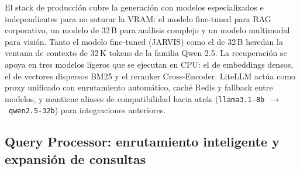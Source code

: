 \begin{table}[H]
\centering
\caption{Stack de modelos en producción (versión TFG y sistema empresarial).}
\label{tab:stack-llm-produccion}
\end{table}

El stack de producción cubre la generación con modelos especializados e independientes para no saturar la VRAM: el modelo fine-tuned para RAG corporativo, un modelo de 32\,B para análisis complejo y un modelo multimodal para visión. Tanto el modelo fine-tuned (JARVIS) como el de 32\,B heredan la ventana de contexto de 32\,K tokens de la familia Qwen 2.5. La recuperación se apoya en tres modelos ligeros que se ejecutan en CPU: el de embeddings densos, el de vectores dispersos BM25 y el reranker Cross-Encoder. LiteLLM actúa como proxy unificado con enrutamiento automático, caché Redis y fallback entre modelos, y mantiene aliases de compatibilidad hacia atrás (\texttt{llama3.1-8b}~$\rightarrow$~\texttt{qwen2.5-32b}) para integraciones anteriores.

\subsection{Query Processor: enrutamiento inteligente y expansión de consultas}
\label{subsec:query-processor}

